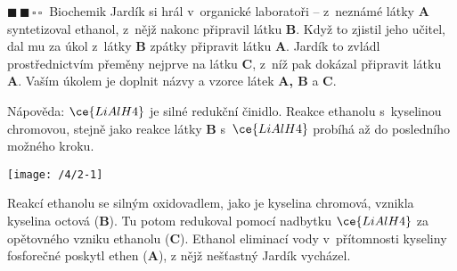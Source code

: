 \documentclass{book}
\newcommand{\dva}{$\blacksquare \, \blacksquare \, \square \, \square \; \; $}
\renewenvironment{quotation}{\par}{\par} %
\begin{document}
\hrulefill %
\begin{quotation}
\dva Biochemik Jardík si hrál v~organické laboratoři -- z~neznámé látky \textbf{A}
syntetizoval ethanol, z~nějž nakonc připravil látku \textbf{B}. Když to
zjistil jeho učitel, dal mu za úkol z~látky \textbf{B} zpátky připravit
látku \textbf{A}. Jardík to zvládl prostřednictvím přeměny nejprve na
látku \textbf{C}, z~níž pak dokázal připravit látku \textbf{A}. Vaším úkolem
je doplnit názvy a vzorce látek \textbf{A, B} a \textbf{C}. 

Nápověda: $\ce{LiAlH4}$ je silné redukční činidlo. Reakce ethanolu s~kyselinou
chromovou, stejně jako reakce látky \textbf{B} s~$\ce{LiAlH4}$ probíhá
až do posledního možného kroku.
\begin{center}

\texttt{[image: /4/2-1]}

\par\end{center}

\end{quotation} \dotfill \par 
Reakcí ethanolu se silným oxidovadlem, jako je kyselina chromová,
vznikla kyselina octová (\textbf{B}). Tu potom redukoval pomocí nadbytku
$\ce{LiAlH4}$ za opětovného vzniku ethanolu (\textbf{C}). Ethanol eliminací
vody v~přítomnosti kyseliny fosforečné poskytl ethen (\textbf{A}),
z nějž nešťastný Jardík vycházel.
\end{document}
